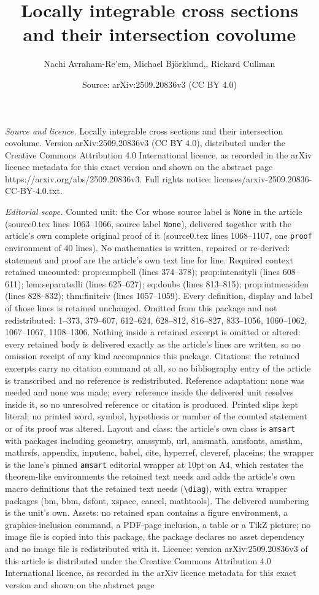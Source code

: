 \documentclass[10pt,a4paper]{amsart}
\title[Locally integrable cross sections and their intersection cov]{Locally integrable cross sections and their intersection covolume}
\author{Nachi Avraham-Re'em, Michael Bj\"orklund,, Rickard Cullman}
\date{Source: arXiv:2509.20836v3 (CC BY 4.0)}
\begin{document}
\maketitle

\noindent\emph{Source and licence.} Locally integrable cross sections and their intersection covolume. Version arXiv:2509.20836v3 (CC BY 4.0), distributed under the Creative Commons Attribution 4.0 International licence, as recorded in the arXiv licence metadata for this exact version and shown on the abstract page https://arxiv.org/abs/2509.20836v3. Full rights notice: licenses/arxiv-2509.20836-CC-BY-4.0.txt.\par\smallskip

\noindent\textit{Editorial scope.} Counted unit: the Cor whose source label is \texttt{None} in the article (source0.tex lines 1063--1066, source label \texttt{None}), delivered together with the article's own complete original proof of it (source0.tex lines 1068--1107, one \texttt{proof} environment of 40 lines). No mathematics is written, repaired or re-derived: statement and proof are the article's own text line for line. Required context retained uncounted: prop:campbell (lines 374--378); prop:intensityli (lines 608--611); lem:separatedli (lines 625--627); eq:doubs (lines 813--815); prop:intmeasiden (lines 828--832); thm:finiteiv (lines 1057--1059). Every definition, display and label of those lines is retained unchanged. Omitted from this package and not redistributed: 1--373, 379--607, 612--624, 628--812, 816--827, 833--1056, 1060--1062, 1067--1067, 1108--1306. Nothing inside a retained excerpt is omitted or altered: every retained body is delivered exactly as the article's lines are written, so no omission receipt of any kind accompanies this package. Citations: the retained excerpts carry no citation command at all, so no bibliography entry of the article is transcribed and no reference is redistributed. Reference adaptation: none was needed and none was made; every reference inside the delivered unit resolves inside it, so no unresolved reference or citation is produced. Printed slips kept literal: no printed word, symbol, hypothesis or number of the counted statement or of its proof was altered. Layout and class: the article's own class is \texttt{amsart} with packages including geometry, amssymb, url, amsmath, amsfonts, amsthm, mathrsfs, appendix, inputenc, babel, cite, hyperref, cleveref, placeins; the wrapper is the lane's pinned \texttt{amsart} editorial wrapper at 10pt on A4, which restates the theorem-like environments the retained text needs and adds the article's own macro definitions that the retained text needs (\texttt{\textbackslash diag}), with extra wrapper packages (bm, bbm, dsfont, xspace, cancel, mathtools). The delivered numbering is the unit's own. Assets: no retained span contains a figure environment, a graphics-inclusion command, a PDF-page inclusion, a table or a TikZ picture; no image file is copied into this package, the package declares no asset dependency and no image file is redistributed with it. Licence: version arXiv:2509.20836v3 of this article is distributed under the Creative Commons Attribution 4.0 International licence, as recorded in the arXiv licence metadata for this exact version and shown on the abstract page 
\end{document}
